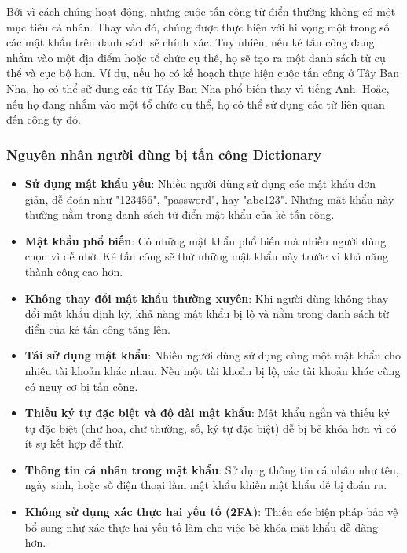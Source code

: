 Bởi vì cách chúng hoạt động, những cuộc tấn công từ điển thường không có một mục tiêu cá nhân. Thay vào đó, chúng được thực hiện với hi vọng một trong số các mật khẩu trên danh sách sẽ chính xác. Tuy nhiên, nếu kẻ tấn công đang nhắm vào một địa điểm hoặc tổ chức cụ thể, họ sẽ tạo ra một danh sách từ cụ thể và cục bộ hơn. Ví dụ, nếu họ có kế hoạch thực hiện cuộc tấn công ở Tây Ban Nha, họ có thể sử dụng các từ Tây Ban Nha phổ biến thay vì tiếng Anh. Hoặc, nếu họ đang nhắm vào một tổ chức cụ thể, họ có thể sử dụng các từ liên quan đến công ty đó.
\subsubsection{Nguyên nhân người dùng bị tấn công Dictionary}

\begin{itemize}
    \item \textbf{Sử dụng mật khẩu yếu}: Nhiều người dùng sử dụng các mật khẩu đơn giản, dễ đoán như "123456", "password", hay "abc123". Những mật khẩu này thường nằm trong danh sách từ điển mật khẩu của kẻ tấn công.
    \item \textbf{Mật khẩu phổ biến}: Có những mật khẩu phổ biến mà nhiều người dùng chọn vì dễ nhớ. Kẻ tấn công sẽ thử những mật khẩu này trước vì khả năng thành công cao hơn.
    \item \textbf{Không thay đổi mật khẩu thường xuyên}: Khi người dùng không thay đổi mật khẩu định kỳ, khả năng mật khẩu bị lộ và nằm trong danh sách từ điển của kẻ tấn công tăng lên.
    \item \textbf{Tái sử dụng mật khẩu}: Nhiều người dùng sử dụng cùng một mật khẩu cho nhiều tài khoản khác nhau. Nếu một tài khoản bị lộ, các tài khoản khác cũng có nguy cơ bị tấn công.
    \item \textbf{Thiếu ký tự đặc biệt và độ dài mật khẩu}: Mật khẩu ngắn và thiếu ký tự đặc biệt (chữ hoa, chữ thường, số, ký tự đặc biệt) dễ bị bẻ khóa hơn vì có ít sự kết hợp để thử.
    \item \textbf{Thông tin cá nhân trong mật khẩu}: Sử dụng thông tin cá nhân như tên, ngày sinh, hoặc số điện thoại làm mật khẩu khiến mật khẩu dễ bị đoán ra.
    \item \textbf{Không sử dụng xác thực hai yếu tố (2FA)}: Thiếu các biện pháp bảo vệ bổ sung như xác thực hai yếu tố làm cho việc bẻ khóa mật khẩu dễ dàng hơn.
\end{itemize}
